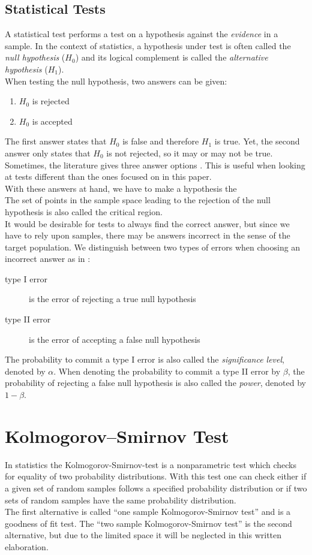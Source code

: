 \documentclass{article}
\theoremstyle{definition}
\begin{document}
\subsection{Statistical Tests}
A statistical test performs a test on a hypothesis against the \emph{evidence} in a sample.
In the context of statistics, a hypothesis under test is often called the \emph{null hypothesis} ($H_0$) and its logical complement is called the \emph{alternative hypothesis} ($H_1$).
\\
When testing the null hypothesis, two answers can be given:
\begin{enumerate}
	\item $H_0$ is rejected
	\item $H_0$ is accepted
\end{enumerate}
The first answer states that $H_0$ is false and therefore $H_1$ is true.
Yet, the second answer only states that $H_0$ is not rejected, so it may or may not be true.
Sometimes, the literature gives three answer options \cite{weigand2009statistik}.
This is useful when looking at tests different than the ones focused on in this paper.
\\
With these answers at hand, we have to make a hypothesis the 
\\
The set of points in the sample space leading to the rejection of the null hypothesis is also called the critical region.
\\
It would be desirable for tests to always find the correct answer, but since we have to rely upon samples, there may be answers incorrect in the sense of the target population.
We distinguish between two types of errors when choosing an incorrect answer as in \cite{conover1980practical}:
\begin{description}
	\item[type I error] is the error of rejecting a true null hypothesis
	\item[type II error] is the error of accepting a false null hypothesis
\end{description}
The probability to commit a type I error is also called the \emph{significance level}, denoted by $\alpha$.
When denoting the probability to commit a type II error by $\beta$, the probability of rejecting a false null hypothesis is also called the \emph{power}, denoted by $1-\beta$.



\section{Kolmogorov–Smirnov Test}
In statistics the Kolmogorov-Smirnov-test is a nonparametric test which checks for equality of two probability distributions.
With this test one can check either if a given set of random samples follows a specified probability distribution or if two sets of random samples have the same probability distribution.\\
The first alternative is called ``one sample Kolmogorov-Smirnov test'' and is a goodness of fit test. The ``two sample  Kolmogorov-Smirnov test'' is the second alternative, but due to the limited space it will be neglected in this written elaboration.
\end{document}
